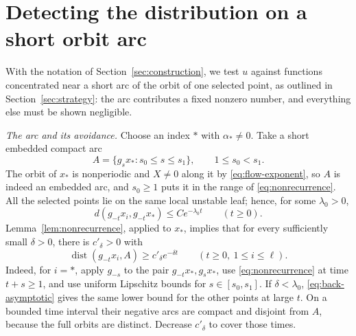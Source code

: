 \documentclass[11pt]{article}
\theoremstyle{remark}
\newcommand{\dist}{\operatorname{dist}}
\begin{document}
\section{Detecting the distribution on a short orbit arc}
\label{sec:detection}

With the notation of Section~\ref{sec:construction}, we test
\(u\) against functions concentrated near a short arc of the orbit of
one selected point, as outlined in Section~\ref{sec:strategy}: the
arc contributes a fixed nonzero number, and everything else must be
shown negligible.

\emph{The arc and its avoidance.}
Choose an index \(*\) with \(\alpha_*\ne0\).
Take a short embedded compact arc
\[
 A=\{g_sx_*:s_0\le s\le s_1\},\qquad 1\le s_0<s_1 .
\]
The orbit of \(x_*\) is nonperiodic and \(X\ne0\) along it by
\eqref{eq:flow-exponent}, so \(A\) is indeed
an embedded arc, and \(s_0\ge1\) puts it in the range of
\eqref{eq:nonrecurrence}.
All the selected points lie on the same local unstable leaf; hence, for
some \(\lambda_0>0\),
\begin{equation}\label{eq:back-asymptotic}
 d(g_{-t}x_i,g_{-t}x_*)\le Ce^{-\lambda_0t}
                           \qquad(t\ge0).
\end{equation}
Lemma~\ref{lem:nonrecurrence}, applied to \(x_*\), implies that for
every sufficiently small \(\delta>0\), there is \(c'_\delta>0\) with
\begin{equation}\label{eq:arc-avoid}
 \dist(g_{-t}x_i,A)\ge c'_\delta e^{-\delta t}
                   \qquad(t\ge0,\ 1\le i\le\ell).
\end{equation}
Indeed, for \(i=*\), apply \(g_{-s}\) to the pair
\(g_{-t}x_*,g_sx_*\), use \eqref{eq:nonrecurrence} at time \(t+s\ge1\),
and use uniform Lipschitz bounds for \(s\in[s_0,s_1]\).
If \(\delta<\lambda_0\), \eqref{eq:back-asymptotic} gives the same
lower bound for the other points at large \(t\).
On a bounded time interval their negative arcs are compact and
disjoint from \(A\), because the full orbits are distinct.
Decrease \(c'_\delta\) to cover those times.

\end{document}
